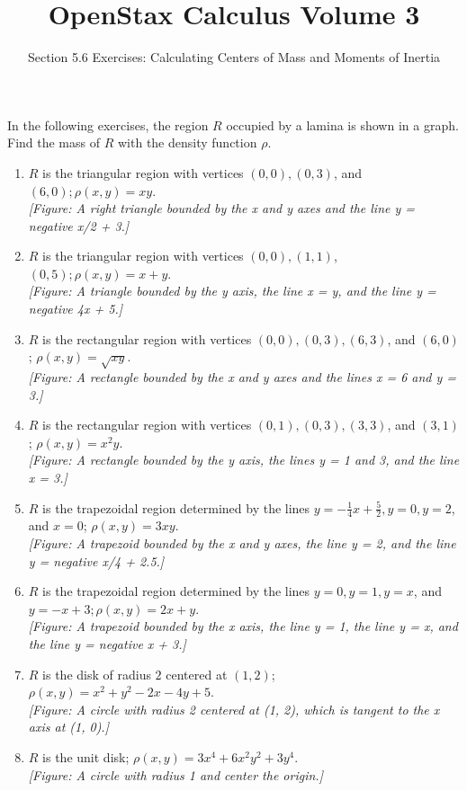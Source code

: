 \documentclass{exercises}
\title{OpenStax Calculus Volume 3}
\subtitle{Section 5.6 Exercises: Calculating Centers of Mass and Moments of Inertia}
\author{}
\date{}
\begin{document}
\maketitle


In the following exercises, the region $R$ occupied by a lamina is shown in a graph. Find the mass of $R$ with the density function $\rho$.

\begin{enumerate}[start=1]
\item $R$ is the triangular region with vertices $(0,0),(0,3)$, and $(6,0);\rho(x,y)=xy$. \\ \textit{[Figure: A right triangle bounded by the x and y axes and the line y = negative x/2 + 3.]}
\item $R$ is the triangular region with vertices $(0,0),(1,1)$, $(0,5);\rho(x,y)=x+y$. \\ \textit{[Figure: A triangle bounded by the y axis, the line x = y, and the line y = negative 4x + 5.]}
\item $R$ is the rectangular region with vertices $(0,0),(0,3),(6,3)$, and $(6,0)$; $\rho(x,y)=\sqrt{xy}$. \\ \textit{[Figure: A rectangle bounded by the x and y axes and the lines x = 6 and y = 3.]}
\item $R$ is the rectangular region with vertices $(0,1),(0,3),(3,3)$, and $(3,1)$; $\rho(x,y)=x^{2}y$. \\ \textit{[Figure: A rectangle bounded by the y axis, the lines y = 1 and 3, and the line x = 3.]}
\item $R$ is the trapezoidal region determined by the lines $y=-\frac{1}{4}x+\frac{5}{2},y=0,y=2$, and $x=0$; $\rho(x,y)=3xy$. \\ \textit{[Figure: A trapezoid bounded by the x and y axes, the line y = 2, and the line y = negative x/4 + 2.5.]}
\item $R$ is the trapezoidal region determined by the lines $y=0,y=1,y=x$, and $y=-x+3;\rho(x,y)=2x+y$. \\ \textit{[Figure: A trapezoid bounded by the x axis, the line y = 1, the line y = x, and the line y = negative x + 3.]}
\item $R$ is the disk of radius $2$ centered at $(1,2)$; $\rho(x,y)=x^{2}+y^{2}-2x-4y+5$. \\ \textit{[Figure: A circle with radius 2 centered at (1, 2), which is tangent to the x axis at (1, 0).]}
\item $R$ is the unit disk; $\rho(x,y)=3x^{4}+6x^{2}y^{2}+3y^{4}$. \\ \textit{[Figure: A circle with radius 1 and center the origin.]}

\end{enumerate}
\end{document}
